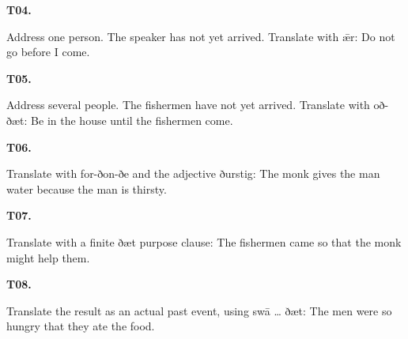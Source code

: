 \par\begin{minipage}{\linewidth}\raggedright
\textbf{T04.}

Address one person. The speaker has not yet arrived. Translate with ǣr: Do not go before I come.

\end{minipage}\par\addvspace{4pt}

\par\begin{minipage}{\linewidth}\raggedright
\textbf{T05.}

Address several people. The fishermen have not yet arrived. Translate with oð-ðæt: Be in the house until the fishermen come.

\end{minipage}\par\addvspace{4pt}

\par\begin{minipage}{\linewidth}\raggedright
\textbf{T06.}

Translate with for-ðon-ðe and the adjective ðurstig: The monk gives the man water because the man is thirsty.

\end{minipage}\par\addvspace{4pt}

\par\begin{minipage}{\linewidth}\raggedright
\textbf{T07.}

Translate with a finite ðæt purpose clause: The fishermen came so that the monk might help them.

\end{minipage}\par\addvspace{4pt}

\par\begin{minipage}{\linewidth}\raggedright
\textbf{T08.}

Translate the result as an actual past event, using swā … ðæt: The men were so hungry that they ate the food.

\end{minipage}\par\addvspace{4pt}

